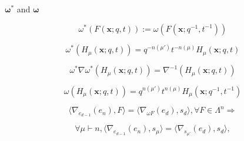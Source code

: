 \documentclass[12pt]{amsart}
\begin{document}
\vspace{-10pt}
\begin{mdframed}[linecolor=cyan!20,linewidth=3pt,innertopmargin=8pt]
	\begin{minipage}[t]{9cm}
		\begin{bf}$\bm{\omega^*}$ and $\bm{\omega}$\end{bf}
		\begin{equation}\omega^*(F(\bm{x};q,t)):=\omega\left(F\left(\bm{x};q^{-1},t^{-1}\right)\right)
		\end{equation}
	\end{minipage}
	\begin{minipage}[t]{9cm}
		\begin{bf}\end{bf}
		\begin{equation} \omega^*(H_\mu(\bm{x};q,t))=q^{-n(\mu')}t^{-n(\mu)}H_\mu(\bm{x};q,t)
		\end{equation}
	\end{minipage}

	\begin{minipage}[t]{9cm}
		\begin{bf}\end{bf}
		\begin{equation}\omega^*\nabla\omega^*(H_\mu(\bm{x};q,t))=\nabla^{-1}(H_\mu(\bm{x};q,t))
		\end{equation}
	\end{minipage}
	\begin{minipage}[t]{9cm}
		\begin{bf}\end{bf}
		\begin{equation}\omega(H_\mu(\bm{x};q,t))=q^{n(\mu')}t^{n(\mu)}H_\mu(\bm{x};q^{-1},t^{-1}) \end{equation}
	\end{minipage}

	\begin{minipage}[t]{10cm}
		\begin{equation}\langle \nabla_{e_{d-1}}(e_n),F\rangle=\langle \nabla_{\omega F}(e_d),s_d\rangle, \forall F\in \Lambda^n  \Rightarrow
		\end{equation}
	\end{minipage}
	\begin{minipage}[t]{5.75cm}
		\begin{equation*}\forall \mu\vdash n, \langle \nabla_{e_{d-1}}(e_n),s_\mu \rangle=\langle \nabla_{s_{\mu'}}(e_d),s_d\rangle,
		\end{equation*}
	\end{minipage}
\end{mdframed}
\end{document}

